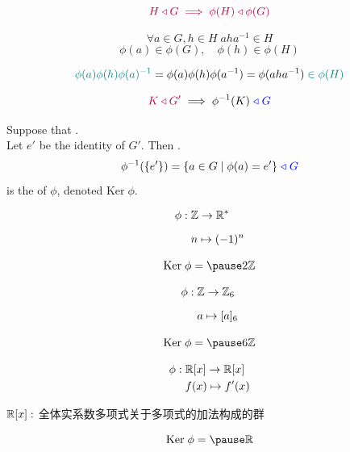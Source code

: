 \begin{frame}
  \[
    \textcolor{purple}{H \triangleleft G \implies \phi(H) \triangleleft \phi(G)}
  \]

  \pause
  \[
    \forall a \in G, h \in H\; aha^{-1} \in H
  \]
  \pause
  \[
    \phi(a) \in \phi(G), \quad \phi(h) \in \phi(H)
  \]

  \pause
  \[
    \textcolor{teal}{\phi(a) \phi(h) \phi(a)^{-1}}
      = \phi(a) \phi(h) \phi(a^{-1})
      = \phi(aha^{-1}) \textcolor{teal}{\;\in \phi(H)}
  \]
\end{frame}

\begin{frame}
  \[
    \textcolor{purple}{K \triangleleft G'} \implies \phi^{-1}(K) \textcolor{blue}{\;\triangleleft\; G}
  \]

  \pause
  \begin{definition}
    Suppose that . \\[3pt]
    Let $e'$ be the identity of $G'$. Then .
    \[
      \phi^{-1}(\{e'\}) = \{a \in G \mid \phi(a) = e'\} \textcolor{blue}{\;\triangleleft\; G}
    \]
    is the  of $\phi$, denoted $\text{Ker}\; \phi$.
  \end{definition}
\end{frame}

\begin{frame}{}
  \begin{align*}
    \phi:\; & \mathbb{Z} \to \mathbb{R}^{\ast} \\[6pt]
            & n \mapsto (-1)^{n}
  \end{align*}

  \[
    \text{Ker}\; \phi = \pause 2\Z
  \]
\end{frame}

\begin{frame}{}
  \begin{align*}
    \phi:\; & \mathbb{Z} \to \mathbb{Z}_{6} \\[6pt]
            & a \mapsto [a]_{6}
  \end{align*}

  \[
    \text{Ker}\; \phi = \pause 6\Z
  \]
\end{frame}

\begin{frame}{}
  \begin{align*}
    \phi:\; & \mathbb{R}[x] \to \mathbb{R}[x] \\
            & f(x) \mapsto f'(x)
  \end{align*}

  \vspace{0.30cm}
  \begin{center}
    $\mathbb{R}[x]:$ 全体实系数多项式关于多项式的加法构成的群
  \end{center}

  \[
    \text{Ker}\; \phi = \pause \R
  \]
\end{frame}


